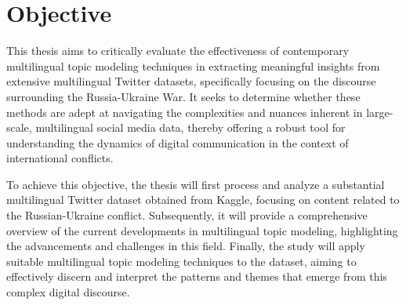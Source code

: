 {\let\clearpage\relax \chapter{Objective}}
This thesis aims to critically evaluate the effectiveness of contemporary multilingual topic modeling techniques in extracting meaningful insights from extensive multilingual Twitter datasets, specifically focusing on the discourse surrounding the Russia-Ukraine War. It seeks to determine whether these methods are adept at navigating the complexities and nuances inherent in large-scale, multilingual social media data, thereby offering a robust tool for understanding the dynamics of digital communication in the context of international conflicts.

To achieve this objective, the thesis will first process and analyze a substantial multilingual Twitter dataset obtained from Kaggle, focusing on content related to the Russian-Ukraine conflict. Subsequently, it will provide a comprehensive overview of the current developments in multilingual topic modeling, highlighting the advancements and challenges in this field. Finally, the study will apply suitable multilingual topic modeling techniques to the dataset, aiming to effectively discern and interpret the patterns and themes that emerge from this complex digital discourse.
